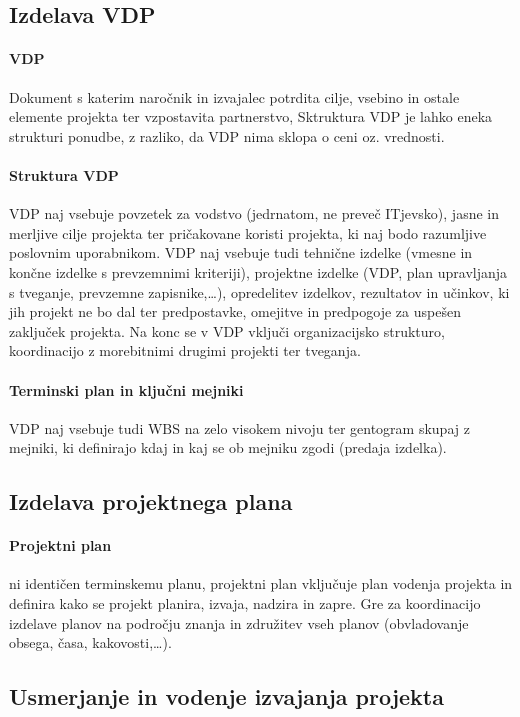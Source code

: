 \documentclass[a4paper,12pt]{report}
\begin{document}
      \subsection{Izdelava VDP}
         \paragraph{VDP} Dokument s katerim naročnik in izvajalec potrdita cilje, vsebino in ostale elemente projekta ter vzpostavita partnerstvo, Sktruktura VDP je lahko eneka strukturi ponudbe, z razliko, da VDP nima sklopa o ceni oz. vrednosti.
         \paragraph{Struktura VDP} VDP naj vsebuje povzetek za vodstvo (jedrnatom, ne preveč ITjevsko), jasne in merljive cilje projekta ter pričakovane koristi projekta, ki naj bodo razumljive poslovnim uporabnikom. VDP naj vsebuje tudi tehnične izdelke (vmesne in končne izdelke s prevzemnimi kriteriji), projektne izdelke (VDP, plan upravljanja s tveganje, prevzemne zapisnike,\dots), opredelitev izdelkov, rezultatov in učinkov, ki jih projekt ne bo dal ter predpostavke, omejitve in predpogoje za uspešen zaključek projekta. Na konc se v VDP vključi organizacijsko strukturo, koordinacijo z morebitnimi drugimi projekti ter tveganja.
         \paragraph{Terminski plan in ključni mejniki} VDP naj vsebuje tudi WBS na zelo visokem nivoju ter gentogram skupaj z mejniki, ki definirajo kdaj in kaj se ob mejniku zgodi (predaja izdelka).
      
      \subsection{Izdelava projektnega plana}
         \paragraph{Projektni plan} ni identičen terminskemu planu, projektni plan vključuje plan vodenja projekta in definira kako se projekt planira, izvaja, nadzira in zapre. Gre za koordinacijo izdelave planov na področju znanja in združitev vseh planov (obvladovanje obsega, časa, kakovosti,\dots).
      \subsection{Usmerjanje in vodenje izvajanja projekta}
\end{document}
